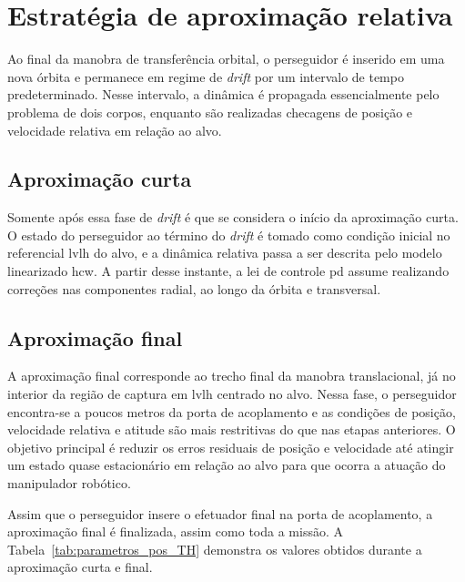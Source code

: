 \section{Estratégia de aproximação relativa}
\label{sec:estrategia_orbital_global}

Ao final da manobra de transferência orbital, o perseguidor é inserido em uma nova órbita e permanece em regime de \textit{drift} por um intervalo de tempo predeterminado.
Nesse intervalo, a dinâmica é propagada essencialmente pelo problema de dois corpos, enquanto são realizadas checagens de posição e velocidade relativa em relação ao alvo.

\subsection{Aproximação curta}
\label{sec:aproximacao_curta}

Somente após essa fase de \textit{drift} é que se considera o início da aproximação curta.
O estado do perseguidor ao término do \textit{drift} é tomado como condição inicial no referencial \gls{lvlh} do alvo, e a dinâmica relativa passa a ser descrita pelo modelo linearizado \gls{hcw}.
A partir desse instante, a lei de controle \gls{pd} assume realizando correções nas componentes radial, ao longo da órbita e transversal.

\subsection{Aproximação final}
\label{sec:aproximacao_final}

A aproximação final corresponde ao trecho final da manobra translacional, já no interior da região de captura em \gls{lvlh} centrado no alvo.
Nessa fase, o perseguidor encontra-se a poucos metros da porta de acoplamento e as condições de posição, velocidade relativa e atitude são mais restritivas do que nas etapas anteriores.
O objetivo principal é reduzir os erros residuais de posição e velocidade até atingir um estado quase estacionário em relação ao alvo para que ocorra a atuação do manipulador robótico.

Assim que o perseguidor insere o efetuador final na porta de acoplamento, a aproximação final é finalizada, assim como toda a missão.
A Tabela~\ref{tab:parametros_pos_TH} demonstra os valores obtidos durante a aproximação curta e final.

